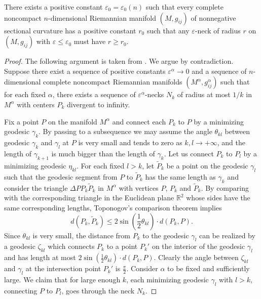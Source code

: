 \begin{proposition}
  \label{prop:cz-neck-radius-lower-bound-at-infinity}

There exists a positive constant $\varepsilon_0=\varepsilon_0(n)$
such that every complete noncompact $n$-dimensional Riemannian
manifold $(M, g_{ij})$ of nonnegative sectional curvature has a
positive constant $r_0$ such that any $\varepsilon$-neck of radius
$r$ on $(M, g_{ij})$ with $\varepsilon \leq \varepsilon_0$ must
have $r\geq r_0$.
\end{proposition}

\begin{proof} The following argument is taken from \cite{CZ05F}.
We argue by contradiction. Suppose there exist a sequence of
positive constants $\varepsilon^\alpha \rightarrow 0$ and a
sequence of $n$-dimensional complete noncompact Riemannian
manifolds $(M^\alpha, g^{\alpha}_{ij})$ such that for each fixed
$\alpha$, there exists a sequence of $\varepsilon^\alpha$-necks
$N_{k}$ of radius at most $1/k$ in $M^\alpha$ with centers $P_{k}$
divergent to infinity.

Fix a point $P$ on the manifold $M^\alpha$ and connect each $P_k$
to $P$ by a minimizing geodesic $\gamma_k$. By passing to a
subsequence we may assume the angle $\theta_{kl}$ between geodesic
$\gamma_k$ and $\gamma_l$ at $P$ is very small and tends to zero
as $k, l\rightarrow+\infty$, and the length of $\gamma_{k+1}$ is
much bigger than the length of $\gamma_k$. Let us connect $P_k$ to
$P_l$ by a minimizing geodesic $\eta_{kl}$. For each fixed $l>k$,
let $\tilde{P}_k$ be a point on the geodesic $\gamma_l$ such that
the geodesic segment from $P$ to $\tilde{P}_k$ has the same length
as $\gamma_k$ and consider the triangle $\Delta PP_k\tilde{P}_k$
in $M^\alpha$ with vertices $P$, $P_k$ and $\tilde{P}_k$. By
comparing with the corresponding triangle in the Euclidean plane
$\mathbb{R}^2$ whose sides have the same corresponding lengths,
Toponogov's comparison theorem implies
$$
d(P_k,\tilde{P}_k)\le 2\sin\left(\frac{1}{2}\theta_{kl}\right)\cdot
d(P_k,P).
$$
Since $\theta_{kl}$ is very small, the distance from $P_k$ to the
geodesic $\gamma_l$ can be realized by a geodesic $\zeta_{kl}$
which connects $P_k$ to a point $P_k'$ on the interior of the
geodesic $\gamma_l$ and has length at most
$2\sin(\frac{1}{2}\theta_{kl})\cdot d(P_k,P).$ Clearly the angle
between $\zeta_{kl}$ and $\gamma_l$ at the intersection point
$P_k'$ is $\frac{\pi}{2}$. Consider $\alpha$ to be fixed and
sufficiently large. We claim that for large enough $k$, each
minimizing geodesic $\gamma_l$ with $l>k$, connecting $P$ to
$P_l$, goes through the neck $N_k$.


\end{proof}
